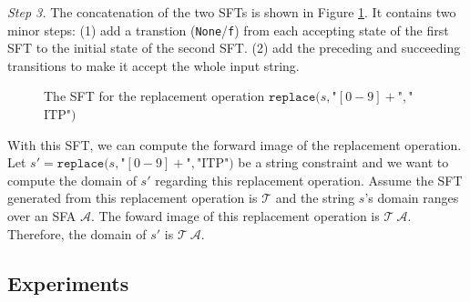 \documentclass[a4paper,UKenglish,cleveref, autoref, thm-restate]{lipics-v2021}
\begin{document}
\noindent\emph{Step 3.}
The concatenation of the two SFTs is shown in Figure \ref{fig-rearranged-automata}. It contains two minor steps: (1) add a transtion (\texttt{None}/\texttt{f}) from each accepting state of the first SFT to the initial state of the second SFT. (2) add the preceding and succeeding transitions to make it accept the whole input string.

\begin{figure}[h] \centering
  \caption{The SFT for the replacement operation $\texttt{replace}(s, $"$[0-9]+$"$, $"$\text{ITP}$"$)$}
  \label{fig-rearranged-automata}
  \end{figure}

  With this SFT, we can compute the forward image of the replacement operation.
  Let $s' = \texttt{replace}(s, $"$[0-9]+$"$, $"$\text{ITP}$"$)$ be a string constraint and we want to compute the domain of $s'$ regarding this replacement operation.
  Assume the SFT generated from this replacement operation is $\mathcal{T}$ and the string $s$'s domain ranges over an SFA $\mathcal{A}$. The foward image of this replacement operation is $\mathcal{T}~\mathcal{A}$. Therefore, the domain of $s'$ is $\mathcal{T}~\mathcal{A}$.





\subsection{Experiments}
\end{document}
